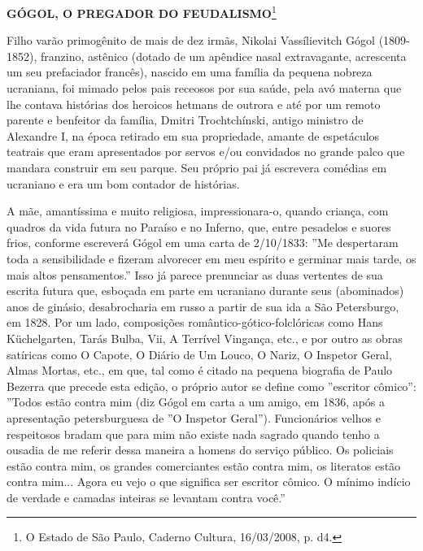 \textbf{GÓGOL, O PREGADOR DO FEUDALISMO}\footnote{O Estado de São Paulo,
  Caderno Cultura, 16/03/2008, p. d4.}

Filho varão primogênito de mais de dez irmãs, Nikolai Vassílievitch
Gógol (1809-1852), franzino, astênico (dotado de um apêndice nasal
extravagante, acrescenta um seu prefaciador francês), nascido em uma
família da pequena nobreza ucraniana, foi mimado pelos pais receosos por
sua saúde, pela avó materna que lhe contava histórias dos heroicos
hetmans de outrora e até por um remoto parente e benfeitor da família,
Dmitri Trochtchínski, antigo ministro de Alexandre I, na época retirado
em sua propriedade, amante de espetáculos teatrais que eram apresentados
por servos e/ou convidados no grande palco que mandara construir em seu
parque. Seu próprio pai já escrevera comédias em ucraniano e era um bom
contador de histórias.

A mãe, amantíssima e muito religiosa, impressionara-o, quando criança,
com quadros da vida futura no Paraíso e no Inferno, que, entre pesadelos
e suores frios, conforme escreverá Gógol em uma carta de 2/10/1833: ''Me
despertaram toda a sensibilidade e fizeram alvorecer em meu espírito e
germinar mais tarde, os mais altos pensamentos.'' Isso já parece
prenunciar as duas vertentes de sua escrita futura que, esboçada em
parte em ucraniano durante seus (abominados) anos de ginásio,
desabrocharia em russo a partir de sua ida a São Petersburgo, em 1828.
Por um lado, composições romântico-gótico-folclóricas como Hans
Küchelgarten, Tarás Bulba, Vii, A Terrível Vingança, etc., e por outro
as obras satíricas como O Capote, O Diário de Um Louco, O Nariz, O
Inspetor Geral, Almas Mortas, etc., em que, tal como é citado na pequena
biografia de Paulo Bezerra que precede esta edição, o próprio autor se
define como ''escritor cômico'': ''Todos estão contra mim (diz Gógol em
carta a um amigo, em 1836, após a apresentação petersburguesa de ''O
Inspetor Geral''). Funcionários velhos e respeitosos bradam que para mim
não existe nada sagrado quando tenho a ousadia de me referir dessa
maneira a homens do serviço público. Os policiais estão contra mim, os
grandes comerciantes estão contra mim, os literatos estão contra mim...
Agora eu vejo o que significa ser escritor cômico. O mínimo indício de
verdade e camadas inteiras se levantam contra você.''

